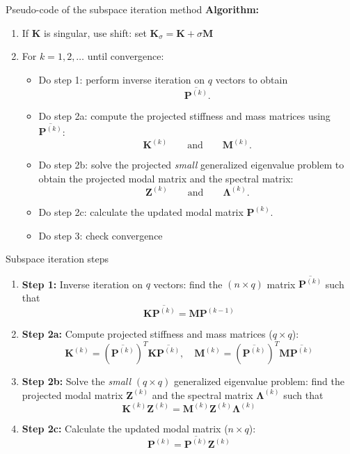 \documentclass[aspectratio=169]{beamer}
\begin{document}
\begin{frame}{Pseudo-code of the subspace iteration method}
  \small \textbf{Algorithm:}
  \begin{enumerate}
    \item If $\mathbf K$ is singular, use shift: set \( \mathbf K_\sigma =\mathbf K + \sigma\mathbf M \)
    \item For \( k = 1, 2, \dots \) until convergence:
          \begin{itemize}
            \item Do step 1: perform inverse iteration on \( q \) vectors to obtain
                  $$\overline{\mathbf P^{(k)}}.$$
            \item Do step 2a: compute the projected stiffness and mass matrices using $\overline{\mathbf P^{(k)}}$:
                  $$\mathbf K^{(k)} \qquad\text{and}\qquad \mathbf M^{(k)}.$$
            \item Do step 2b: solve the projected \emph{small} generalized eigenvalue problem to obtain the projected modal matrix and the spectral matrix:
                  $$\mathbf Z^{(k)} \qquad\text{and}\qquad \mathbf \Lambda^{(k)}.$$

            \item Do step 2c: calculate the updated modal matrix \( \mathbf P^{(k)} \).
            \item Do step 3: check convergence
          \end{itemize}
  \end{enumerate}
\end{frame}


\begin{frame}{Subspace iteration steps}
  \begin{enumerate}
    \item \textbf{Step 1:} Inverse iteration on \( q \) vectors: find the $(n\times q)$ matrix $\overline{\mathbf P^{(k)}}$ such that
          \[
            \mathbf K\overline{\mathbf P^{(k)}} = \mathbf M\mathbf P^{(k-1)}
          \]
    \item \textbf{Step 2a:} Compute projected stiffness and mass matrices (\(q\times q\)):
          \[
            \mathbf K^{(k)} = (\overline{\mathbf P^{(k)}})^T \mathbf K \overline{\mathbf P^{(k)}}, \quad \mathbf M^{(k)} = (\overline{\mathbf P^{(k)}})^T \mathbf M \overline{\mathbf P^{(k)}}
          \]
    \item \textbf{Step 2b:} Solve the \emph{small} $(q\times q)$ generalized eigenvalue problem: find the projected modal matrix $\mathbf Z^{(k)}$ and the spectral matrix $\mathbf \Lambda^{(k)}$ such that
          \[
            \mathbf K^{(k)}\mathbf Z^{(k)} = \mathbf M^{(k)}\mathbf Z^{(k)} \mathbf \Lambda^{(k)}
          \]
    \item \textbf{Step 2c:} Calculate the updated modal matrix (\(n\times q\)):
          \[
            \mathbf P^{(k)} = \overline{\mathbf P^{(k)}} \mathbf Z^{(k)}
          \]
  \end{enumerate}
\end{frame}
\end{document}
